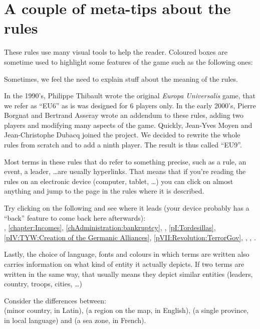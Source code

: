 \section*{A couple of meta-tips about the rules}
These rules use many visual tools to help the reader. Coloured boxes are
sometime used to highlight some features of the game such as the following
ones:
\begin{designnote}
  Sometimes, we feel the need to explain stuff about the meaning of the rules.
\end{designnote}
\begin{histoire}
  In the 1990's, Philippe Thibault wrote the original \emph{Europa
    Universalis} game, that we refer as ``EU6'' as is was designed for 6
  players only. In the early 2000's, Pierre Borgnat and Bertrand Asseray wrote
  an addendum to these rules, adding two players and modifying many aspects of
  the game. Quickly, Jean-Yves Moyen and Jean-Christophe Dubacq joined the
  project. We decided to rewrite the whole rules from scratch and to add a
  ninth player. The result is thus called ``EU9''.
\end{histoire}

Most terms in these rules that do refer to something precise, such as a rule,
an event, a leader, \ldots are usually hyperlinks. That means that if you're
reading the rules on an electronic device (computer, tablet, \ldots) you can
click on almost anything and jump to the page in the rules where it is
described.
\begin{exemple}
  Try clicking on the following and see where it leads (your device probably
  has a ``back'' feature to come back here afterwards):\\
  \ANG, \ref{chapter:Incomes}, \ref{chAdministration:bankruptcy},
  \continentBrazil, \ref{pI:Tordesillas}, \ref{pIV:TYW:Creation of the
    Germanic Alliances}, \ref{pVII:Revolution:TerrorGov}, \monarqueSuleyman,
  \ministreRichelieu, .
\end{exemple}

Lastly, the choice of language, fonts and colours in which terms are written
also carries information on what kind of entity it actually depicts. If two
terms are written in the same way, that usually means they depict similar
entities (leaders, country, troops, cities, \ldots)
\begin{exemple}
  Consider the differences between:\\
  \paysVnorvege (minor country, in Latin), \regionNorvege (a region on the
  map, in English), \provinceNorvege (a single province, in local language)
  and \seazoneNorvege (a sea zone, in French).
\end{exemple}

